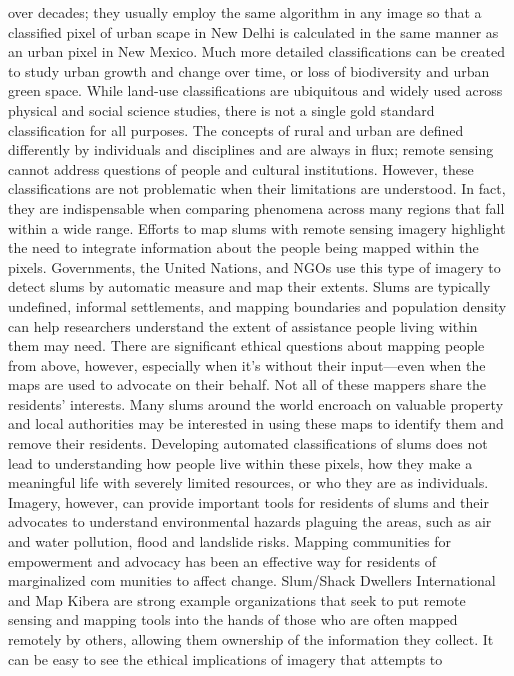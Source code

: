 \begin{itemize}
over decades; they usually employ the same algorithm in any image so that
a classified pixel of urban scape in New Delhi is calculated in the same manner
as an urban pixel in New Mexico. Much more detailed classifications
can be created to study urban growth and change over time, or loss of biodiversity
and urban green space.
While land-use classifications are ubiquitous and widely used across physical
and social science studies, there is not a single gold standard classification
for all purposes. The concepts of rural and urban are defined differently
by individuals and disciplines and are always in flux; remote sensing cannot
address questions of people and cultural institutions. However, these classifications
are not problematic when their limitations are understood. In fact,
they are indispensable when comparing phenomena across many regions
that fall within a wide range.
Efforts to map slums with remote sensing imagery highlight the need to
integrate information about the people being mapped within the pixels.
Governments, the United Nations, and NGOs use this type of imagery to
detect slums by automatic measure and map their extents. Slums are typically
undefined, informal settlements, and mapping boundaries and population
density can help researchers understand the extent of assistance people
living within them may need. There are significant ethical questions about
mapping people from above, however, especially when it's without their
input—even when the maps are used to advocate on their behalf. Not all of
these mappers share the residents' interests. Many slums around the world
encroach on valuable property and local authorities may be interested in
using these maps to identify them and remove their residents. Developing
automated classifications of slums does not lead to understanding how people
live within these pixels, how they make a meaningful life with severely
limited resources, or who they are as individuals. Imagery, however, can
provide important tools for residents of slums and their advocates to understand
environmental hazards plaguing the areas, such as air and water pollution,
flood and landslide risks. Mapping communities for empowerment
and advocacy has been an effective way for residents of marginalized com
munities to affect change. Slum/Shack Dwellers International and Map
Kibera are strong example organizations that seek to put remote sensing
and mapping tools into the hands of those who are often mapped remotely
by others, allowing them ownership of the information they collect.
It can be easy to see the ethical implications of imagery that attempts to

\end{itemize}
